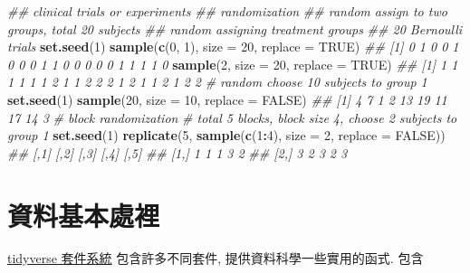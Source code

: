 \documentclass[
]{book}
\newenvironment{Shaded}{\begin{snugshade}}{\end{snugshade}}
\newcommand{\CommentTok}[1]{\textcolor[rgb]{0.56,0.35,0.01}{\textit{#1}}}
\newcommand{\DataTypeTok}[1]{\textcolor[rgb]{0.13,0.29,0.53}{#1}}
\newcommand{\DecValTok}[1]{\textcolor[rgb]{0.00,0.00,0.81}{#1}}
\newcommand{\KeywordTok}[1]{\textcolor[rgb]{0.13,0.29,0.53}{\textbf{#1}}}
\newcommand{\NormalTok}[1]{#1}
\newcommand{\OperatorTok}[1]{\textcolor[rgb]{0.81,0.36,0.00}{\textbf{#1}}}
\newcommand{\OtherTok}[1]{\textcolor[rgb]{0.56,0.35,0.01}{#1}}
\begin{document}
\begin{Shaded}
\begin{Highlighting}[]
\CommentTok{\#\# clinical trials or experiments}
\CommentTok{\#\# randomization}
\CommentTok{\#\# random assign to two groups, total 20 subjects}
\CommentTok{\#\# random assigning treatment groups}
\CommentTok{\#\# 20 Bernoulli trials}
\KeywordTok{set.seed}\NormalTok{(}\DecValTok{1}\NormalTok{)}
\KeywordTok{sample}\NormalTok{(}\KeywordTok{c}\NormalTok{(}\DecValTok{0}\NormalTok{, }\DecValTok{1}\NormalTok{), }\DataTypeTok{size =} \DecValTok{20}\NormalTok{, }\DataTypeTok{replace =} \OtherTok{TRUE}\NormalTok{)}
\CommentTok{\#\#  [1] 0 1 0 0 1 0 0 0 1 1 0 0 0 0 0 1 1 1 1 0}
\KeywordTok{sample}\NormalTok{(}\DecValTok{2}\NormalTok{, }\DataTypeTok{size =} \DecValTok{20}\NormalTok{, }\DataTypeTok{replace =} \OtherTok{TRUE}\NormalTok{)}
\CommentTok{\#\#  [1] 1 1 1 1 1 1 2 1 1 2 2 2 1 2 1 1 2 1 2 2}
\CommentTok{\# random choose 10 subjects to group 1}
\KeywordTok{set.seed}\NormalTok{(}\DecValTok{1}\NormalTok{)}
\KeywordTok{sample}\NormalTok{(}\DecValTok{20}\NormalTok{, }\DataTypeTok{size =} \DecValTok{10}\NormalTok{, }\DataTypeTok{replace =} \OtherTok{FALSE}\NormalTok{)}
\CommentTok{\#\#  [1]  4  7  1  2 13 19 11 17 14  3}
\CommentTok{\# block randomization}
\CommentTok{\# total 5 blocks, block size 4, choose 2 subjects to group 1}
\KeywordTok{set.seed}\NormalTok{(}\DecValTok{1}\NormalTok{)}
\KeywordTok{replicate}\NormalTok{(}\DecValTok{5}\NormalTok{, }\KeywordTok{sample}\NormalTok{(}\KeywordTok{c}\NormalTok{(}\DecValTok{1}\OperatorTok{:}\DecValTok{4}\NormalTok{), }\DataTypeTok{size =} \DecValTok{2}\NormalTok{, }\DataTypeTok{replace =} \OtherTok{FALSE}\NormalTok{))}
\CommentTok{\#\#      [,1] [,2] [,3] [,4] [,5]}
\CommentTok{\#\# [1,]    1    1    1    3    2}
\CommentTok{\#\# [2,]    3    2    3    2    3}
\end{Highlighting}
\end{Shaded}

\hypertarget{ux8cc7ux6599ux57faux672cux8655ux88e1}{%
\chapter{資料基本處裡}\label{ux8cc7ux6599ux57faux672cux8655ux88e1}}

\href{https://www.tidyverse.org/}{tidyverse 套件系統}
包含許多不同套件,
提供資料科學一些實用的函式.
包含
\end{document}
